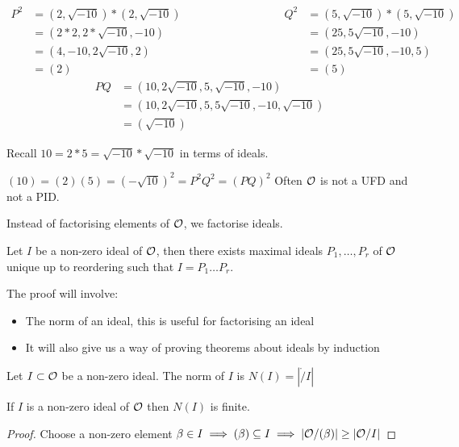 \documentclass[11pt]{article}
\begin{document}
\begin{align*}
	P^2  &= (2, \sqrt{-10}) * ( 2, \sqrt{-10}) \hspace{100pt}& Q^2 &=(5, \sqrt{-10})*(5, \sqrt{-10})  \\
	& = (2*2, 2*\sqrt{-10}, -10)   && = (25, 5\sqrt{-10}, -10 )\\
	& = (4, -10, 2\sqrt{-10}, 2) &&=(25, 5\sqrt{-10}, -10, 5)\\
	& = (2) && =(5)
\end{align*}
\begin{align*}
	PQ &= (10, 2\sqrt{-10}, 5, \sqrt{-10} , -10 )\\
	& = (10, 2\sqrt{-10}, 5, 5\sqrt{-10}, -10 ,\sqrt{-10})\\
	& = (\sqrt{-10} )
\end{align*}

Recall $10 = 2*5 = \sqrt{-10} * \sqrt{-10} $ in terms of ideals.

$(10) = (2)(5) = (-\sqrt{10})^2 = P^2 Q^2 = (PQ)^2$ 
\spac
Often $\mathcal{O}$ is not a UFD and not a PID.
\spac

Instead of factorising elements of $\mathcal{O}$, we factorise ideals.

\begin{theorem}
	Let $I$ be a non-zero ideal of $\mathcal{O}$, then there exists maximal ideals $P_1, \dots, P_r$ of $\mathcal{O}$ unique up to reordering such that $I= P_1 \dots P_r$.
\end{theorem}
\spa
The proof will involve:

\begin{itemize}
	\item{The norm of an ideal, this is useful for factorising an ideal}
	\item{It will also give us a way of proving theorems about ideals by induction}
\end{itemize}

\begin{defn}
Let $I \subset \mathcal{O}$ be a non-zero ideal. 
	The norm of $I$ is $N(I) = | \ring/I | $
\end{defn}

\begin{prop}
	If $I$ is a non-zero ideal of $\mathcal{O}$ then $N(I)$ is finite.
\end{prop}

\begin{proof}
	Choose a non-zero element $\beta \in I \implies (\beta)  \subseteq I \implies |\mathcal{O} / (\beta) | \geq |\mathcal{O} / I|$
\end{proof}
\end{document}
